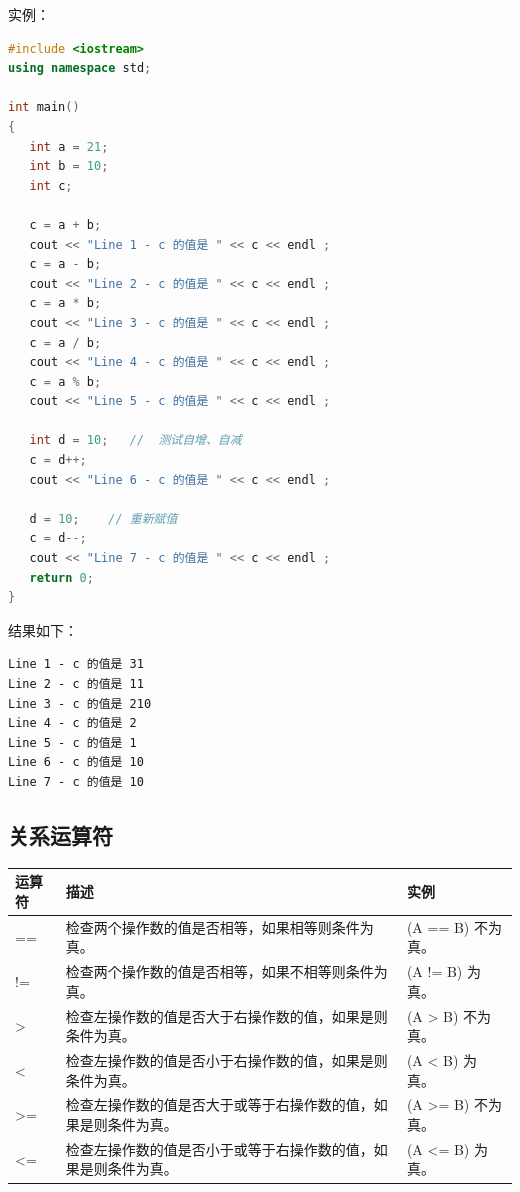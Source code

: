 \documentclass[
  paper=a4,
  ,captions=tableheading
]{scrbook}
\begin{document}
实例：

\begin{lstlisting}[language={C++}]
#include <iostream>
using namespace std;

int main()
{
   int a = 21;
   int b = 10;
   int c;

   c = a + b;
   cout << "Line 1 - c 的值是 " << c << endl ;
   c = a - b;
   cout << "Line 2 - c 的值是 " << c << endl ;
   c = a * b;
   cout << "Line 3 - c 的值是 " << c << endl ;
   c = a / b;
   cout << "Line 4 - c 的值是 " << c << endl ;
   c = a % b;
   cout << "Line 5 - c 的值是 " << c << endl ;

   int d = 10;   //  测试自增、自减
   c = d++;
   cout << "Line 6 - c 的值是 " << c << endl ;

   d = 10;    // 重新赋值
   c = d--;
   cout << "Line 7 - c 的值是 " << c << endl ;
   return 0;
}
\end{lstlisting}

结果如下：

\begin{lstlisting}
Line 1 - c 的值是 31
Line 2 - c 的值是 11
Line 3 - c 的值是 210
Line 4 - c 的值是 2
Line 5 - c 的值是 1
Line 6 - c 的值是 10
Line 7 - c 的值是 10
\end{lstlisting}

\hypertarget{ux5173ux7cfbux8fd0ux7b97ux7b26}{%
\subsection{关系运算符}\label{ux5173ux7cfbux8fd0ux7b97ux7b26}}

\begin{longtable}[]{@{}lll@{}}
\toprule
运算符 & 描述 & 实例 \\
\midrule
\endhead
== & 检查两个操作数的值是否相等，如果相等则条件为真。 & (A == B)
不为真。 \\
!= & 检查两个操作数的值是否相等，如果不相等则条件为真。 & (A != B)
为真。 \\
\textgreater{} &
检查左操作数的值是否大于右操作数的值，如果是则条件为真。 & (A
\textgreater{} B) 不为真。 \\
\textless{} & 检查左操作数的值是否小于右操作数的值，如果是则条件为真。 &
(A \textless{} B) 为真。 \\
\textgreater= &
检查左操作数的值是否大于或等于右操作数的值，如果是则条件为真。 & (A
\textgreater= B) 不为真。 \\
\textless= &
检查左操作数的值是否小于或等于右操作数的值，如果是则条件为真。 & (A
\textless= B) 为真。 \\
\bottomrule
\end{longtable}
\end{document}

